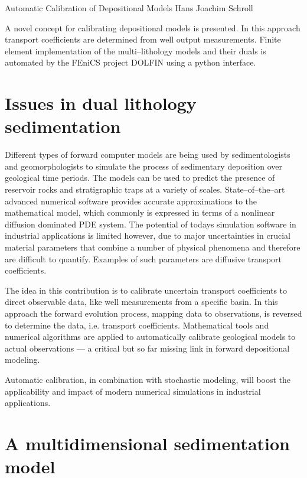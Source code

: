               {Automatic Calibration of Depositional Models}
              {Hans Joachim Schroll}

A novel concept for calibrating depositional models is presented.
In this approach transport coefficients are determined from well output measurements.
Finite element implementation of the multi--lithology models and their duals is automated 
by the FEniCS project DOLFIN using a python interface.


\section{Issues in dual lithology sedimentation}

Different types of forward computer models are being used by sedimentologists and geomorphologists 
to simulate the process of sedimentary deposition over geological time periods. 
The models can be used to predict the presence of reservoir rocks and stratigraphic traps at a variety of scales. 
State--of--the--art advanced numerical software provides accurate approximations to the mathematical model, 
which commonly is expressed in terms of a nonlinear diffusion dominated PDE system. 
The potential of todays simulation software in industrial applications is limited however, 
due to major uncertainties in crucial material parameters that combine a number of physical phenomena 
and therefore are difficult to quantify. 
Examples of such parameters are diffusive transport coefficients.

The idea in this contribution is to calibrate uncertain transport coefficients to direct observable data, 
like well measurements from a specific basin. 
In this approach the forward evolution process, mapping data to observations, 
is reversed to determine the data, i.e. transport coefficients. 
Mathematical tools and numerical algorithms are applied 
to automatically calibrate geological models to actual observations ---
a critical but so far missing link in forward depositional modeling.

Automatic calibration, in combination with stochastic modeling, 
will boost the applicability and impact of modern numerical simulations in industrial applications.

\section{A multidimensional sedimentation model}

